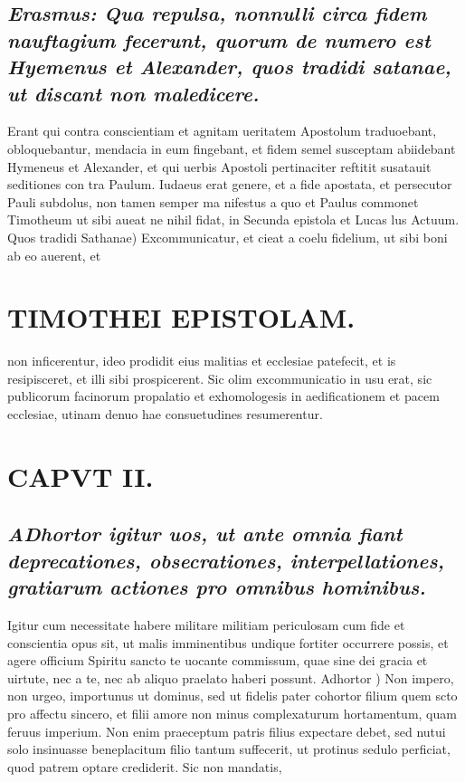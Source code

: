 \documentclass{article}
\begin{document}
\begin{pages}
\subsection*{\textit{Erasmus: Qua repulsa, nonnulli circa fidem nauftagium fecerunt, quorum de numero est Hyemenus et Alexander, quos tradidi satanae, ut discant non maledicere. }}\pstart Erant qui contra conscientiam et agnitam ueritatem Apostolum traduoebant, obloquebantur, mendacia in eum fingebant, et fidem semel susceptam abiidebant Hymeneus et Alexander, et qui uerbis Apostoli pertinaciter reftitit susatauit seditiones con tra Paulum. Iudaeus erat genere, et a fide apostata, et persecutor Pauli subdolus, non tamen semper ma nifestus a quo et Paulus commonet Timotheum ut sibi aueat ne nihil fidat, in Secunda epistola et Lucas lus Actuum.  \pend\pstart Quos tradidi Sathanae) Excommunicatur, et cieat a coelu fidelium, ut sibi boni ab eo auerent, et  \pend
\section*{TIMOTHEI EPISTOLAM. }
\marginpar{[ p.41 ]}\pstart non inficerentur, ideo prodidit eius malitias et ecclesiae patefecit, et is resipisceret, et illi sibi prospicerent. Sic olim excommunicatio in usu erat, sic publicorum facinorum propalatio et exhomologesis in aedificationem et pacem ecclesiae, utinam denuo hae consuetudines resumerentur.  \pend
\section{CAPVT II.}
{}
\subsection*{\textit{\huge\textbf{A}\normalsize Dhortor igitur uos, ut ante omnia fiant deprecationes, obsecrationes, interpellationes, gratiarum actiones pro omnibus hominibus. }}\pstart Igitur cum necessitate habere militare militiam periculosam cum fide et conscientia opus sit, ut malis imminentibus undique fortiter occurrere possis, et agere officium Spiritu sancto te uocante commissum, quae sine dei gracia et uirtute, nec a te, nec ab aliquo praelato haberi possunt.  \pend\pstart Adhortor ) Non impero, non urgeo, importunus ut dominus, sed ut fidelis pater cohortor filium quem scto pro affectu sincero, et filii amore non minus complexaturum hortamentum, quam feruus imperium. Non enim praeceptum patris filius expectare debet, sed nutui solo insinuasse beneplacitum filio tantum suffecerit, ut protinus sedulo perficiat, quod patrem optare crediderit. Sic non mandatis,  \pend

\end{pages}
\end{document}
